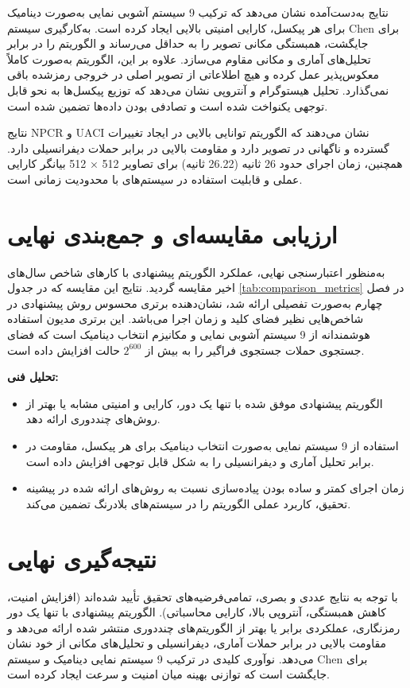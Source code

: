 \documentclass[a4paper,12pt]{report}
\renewcommand{\%}{\lr{\oldpercent}}
\providecommand{\lr}[1]{#1}
\begin{document}
نتایج به‌دست‌آمده نشان می‌دهد که ترکیب 9 سیستم آشوبی نمایی به‌صورت دینامیک برای هر پیکسل، کارایی امنیتی بالایی ایجاد کرده است. به‌کارگیری سیستم \lr{Chen} برای جایگشت، همبستگی مکانی تصویر را به حداقل می‌رساند و الگوریتم را در برابر تحلیل‌های آماری و مکانی مقاوم می‌سازد. علاوه بر این، الگوریتم به‌صورت کاملاً معکوس‌پذیر عمل کرده و هیچ اطلاعاتی از تصویر اصلی در خروجی رمزشده باقی نمی‌گذارد. تحلیل هیستوگرام و آنتروپی نشان می‌دهد که توزیع پیکسل‌ها به نحو قابل توجهی یکنواخت شده است و تصادفی بودن داده‌ها تضمین شده است.

نتایج \lr{NPCR} و \lr{UACI} نشان می‌دهند که الگوریتم توانایی بالایی در ایجاد تغییرات گسترده و ناگهانی در تصویر دارد و مقاومت بالایی در برابر حملات دیفرانسیلی دارد. همچنین، زمان اجرای حدود 26 ثانیه (26.22 ثانیه) برای تصاویر 512 × 512 بیانگر کارایی عملی و قابلیت استفاده در سیستم‌های با محدودیت زمانی است.

\section{ارزیابی مقایسه‌ای و جمع‌بندی نهایی}
به‌منظور اعتبارسنجی نهایی، عملکرد الگوریتم پیشنهادی با کارهای شاخص سال‌های اخیر مقایسه گردید. نتایج این مقایسه که در جدول \ref{tab:comparison_metrics} در فصل چهارم به‌صورت تفصیلی ارائه شد، نشان‌دهنده برتری محسوس روش پیشنهادی در شاخص‌هایی نظیر فضای کلید و زمان اجرا می‌باشد. این برتری مدیون استفاده هوشمندانه از 9 سیستم آشوبی نمایی و مکانیزم انتخاب دینامیک است که فضای جستجوی حملات جستجوی فراگیر را به بیش از $2^{600}$ حالت افزایش داده است.

\textbf{تحلیل فنی:}
\begin{itemize}
    \item الگوریتم پیشنهادی موفق شده با تنها یک دور، کارایی و امنیتی مشابه یا بهتر از روش‌های چنددوری ارائه دهد.
    \item استفاده از 9 سیستم نمایی به‌صورت انتخاب دینامیک برای هر پیکسل، مقاومت در برابر تحلیل آماری و دیفرانسیلی را به شکل قابل توجهی افزایش داده است.
    \item زمان اجرای کمتر و ساده بودن پیاده‌سازی نسبت به روش‌های ارائه شده در پیشینه تحقیق، کاربرد عملی الگوریتم را در سیستم‌های بلادرنگ تضمین می‌کند.
\end{itemize}

\section{نتیجه‌گیری نهایی}
با توجه به نتایج عددی و بصری، تمامی‌فرضیه‌های تحقیق تأیید شده‌اند (افزایش امنیت، کاهش همبستگی، آنتروپی بالا، کارایی محاسباتی). الگوریتم پیشنهادی با تنها یک دور رمزنگاری، عملکردی برابر یا بهتر از الگوریتم‌های چنددوری منتشر شده ارائه می‌دهد و مقاومت بالایی در برابر حملات آماری، دیفرانسیلی و تحلیل‌های مکانی از خود نشان می‌دهد. نوآوری کلیدی در ترکیب 9 سیستم نمایی دینامیک و سیستم \lr{Chen} برای جایگشت است که توازنی بهینه میان امنیت و سرعت ایجاد کرده است.
\end{document}
